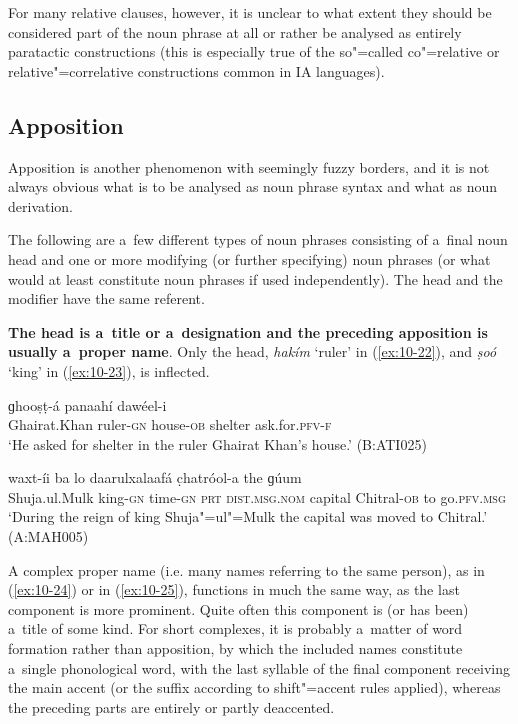 For many relative clauses, however, it is unclear to what extent they should be considered part of the noun phrase at all or rather be analysed as entirely paratactic constructions (this is especially true of the so"=called co"=relative or relative"=correlative constructions common in IA languages). 


\subsection{Apposition}
\label{subsec:10-1-3}

Apposition is another phenomenon with seemingly fuzzy borders, and it is not always obvious what is to be analysed as noun phrase syntax and what as noun derivation.


The following are a~few different types of noun phrases consisting of a~final noun head and one or more modifying (or further specifying) noun phrases (or what would at least constitute noun phrases if used independently). The head and the modifier have the same referent.


\textbf{The head is a~title or a~designation and the preceding apposition is usually a~proper name}. Only the head, \textit{hakím} `ruler' in (\ref{ex:10-22}), and \textit{ṣoó} `king' in (\ref{ex:10-23}), is inflected.

\begin{exe}
\ex
\label{ex:10-22}
\gll [ɣeyrat"=xaán hakim-í] ɡhooṣṭ-á panaahí dawéel-i \\
Ghairat.Khan ruler-\textsc{gn} house-\textsc{ob} shelter ask.for.\textsc{pfv-f} \\
\glt `He asked for shelter in the ruler Ghairat Khan's house.' (B:ATI025)

\ex
\label{ex:10-23}
 waxt-íi ba lo daarulxalaafá c̣hatróol-a the ɡúum \\
Shuja.ul.Mulk king-\textsc{gn} time-\textsc{gn} \textsc{prt} \textsc{dist.msg.nom}  capital Chitral-\textsc{ob} to go.\textsc{pfv.msg}  \\
\glt `During the reign of king Shuja"=ul"=Mulk the capital was moved to Chitral.' (A:MAH005)
\end{exe}

A complex proper name (i.e. many names referring to the same person), as in (\ref{ex:10-24}) or in (\ref{ex:10-25}), functions in much the same way, as the last component is more prominent. Quite often this component is (or has been) a~title of some kind. For short complexes, it is probably a~matter of word formation rather than apposition, by which the included names constitute a~single phonological word, with the last syllable of the final component receiving the main accent (or the suffix according to shift"=accent rules applied), whereas the preceding parts are entirely or partly deaccented.

